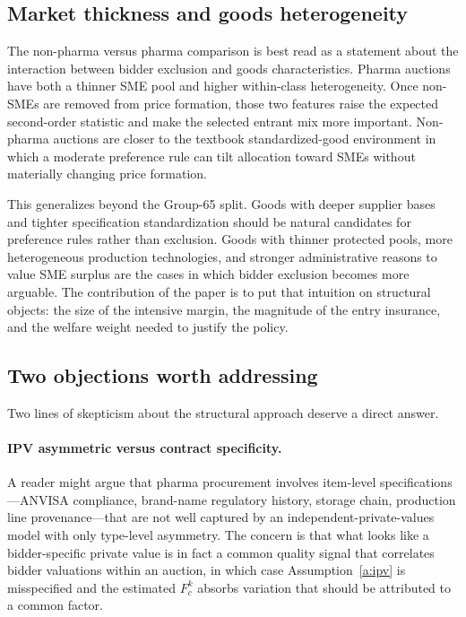 \subsection{Market thickness and goods heterogeneity}

The non-pharma versus pharma comparison is best read as a statement about the interaction between bidder exclusion and goods characteristics. Pharma auctions have both a thinner SME pool and higher within-class heterogeneity. Once non-SMEs are removed from price formation, those two features raise the expected second-order statistic and make the selected entrant mix more important. Non-pharma auctions are closer to the textbook standardized-good environment in which a moderate preference rule can tilt allocation toward SMEs without materially changing price formation.

This generalizes beyond the Group-65 split. Goods with deeper supplier bases and tighter specification standardization should be natural candidates for preference rules rather than exclusion. Goods with thinner protected pools, more heterogeneous production technologies, and stronger administrative reasons to value SME surplus are the cases in which bidder exclusion becomes more arguable. The contribution of the paper is to put that intuition on structural objects: the size of the intensive margin, the magnitude of the entry insurance, and the welfare weight needed to justify the policy.

\subsection{Two objections worth addressing}

Two lines of skepticism about the structural approach deserve a direct answer.

\paragraph{IPV asymmetric versus contract specificity.} A reader might argue that pharma procurement involves item-level specifications---ANVISA compliance, brand-name regulatory history, storage chain, production line provenance---that are not well captured by an independent-private-values model with only type-level asymmetry. The concern is that what looks like a bidder-specific private value is in fact a common quality signal that correlates bidder valuations within an auction, in which case Assumption~\ref{a:ipv} is misspecified and the estimated $F_c^k$ absorbs variation that should be attributed to a common factor.

